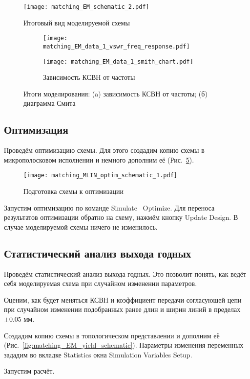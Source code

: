 \begin{figure}[!ht]
    \centering
    \texttt{[image: matching\_EM\_schematic\_2.pdf]}
    \caption{Итоговый вид моделируемой схемы}%
    \label{fig:matching_EM_schematic_2}
\end{figure}

\begin{figure}[!ht]
    \centering
    \begin{subfigure}[b]{0.55\textwidth}
        \centering
        \texttt{[image: matching\_EM\_data\_1\_vswr\_freq\_response.pdf]}
        \caption{}%
    \label{fig:matching_EM_data_1_vswr_freq_response}
    \end{subfigure}
    \hfill
    \begin{subfigure}[b]{0.35\textwidth}
        \centering
        \texttt{[image: matching\_EM\_data\_1\_smith\_chart.pdf]}
        \caption{Зависимость КСВН от частоты}%
    \label{fig:matching_EM_data_1_smith_chart}
    \end{subfigure}
    \caption{%
        Итоги моделирования:
        (a) зависимость КСВН от частоты;
        (б) диаграмма Смита
    }%
    \label{fig:matching_EM_data_1}
\end{figure}

\subsection{Оптимизация}

Проведём оптимизацию схемы.
Для этого создадим копию схемы в микрополосковом исполнении и немного дополним её (Рис.~\ref{fig:matching_MLIN_optim_schematic_1}).

\begin{figure}
    \centering
    \texttt{[image: matching\_MLIN\_optim\_schematic\_1.pdf]}
    \caption{Подготовка схемы к оптимизации}%
    \label{fig:matching_MLIN_optim_schematic_1}
\end{figure}

Запустим оптимизацию по команде Simulate \textrightarrow\ Optimize.
Для переноса результатов оптимизации обратно на схему, нажмём кнопку Update Design.
В случае моделируемой схемы ничего не изменилось.

\subsection{Статистический анализ выхода годных}

Проведём статистический анализ выхода годных.
Это позволит понять, как ведёт себя моделируемая схема при случайном изменении параметров.

Оценим, как будет меняться КСВН и коэффициент передачи согласующей цепи при случайном изменении подобранных ранее длин и ширин линий в пределах $\pm0.05 \text{~мм}$.

Создадим копию схемы в топологическом представлении и дополним её (Рис.~\ref{fig:matching_EM_yield_schematic}).
Параметры изменения переменных зададим во вкладке Statistics окна Simulation Variables Setup.

Запустим расчёт.

